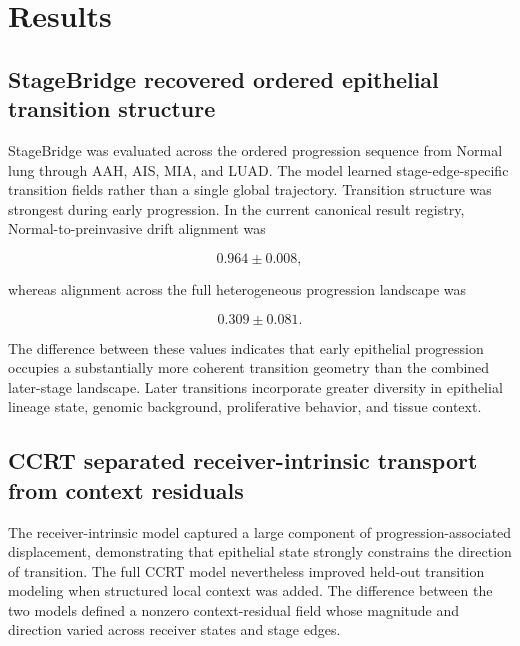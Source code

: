 \chapter{Results} \label{chap:results}

\section{StageBridge recovered ordered epithelial transition structure}

StageBridge was evaluated across the ordered progression sequence from Normal lung through AAH, AIS, MIA, and LUAD. The model learned stage-edge-specific transition fields rather than a single global trajectory. Transition structure was strongest during early progression. In the current canonical result registry, Normal-to-preinvasive drift alignment was

\begin{equation}
0.964\pm0.008,
\end{equation}

whereas alignment across the full heterogeneous progression landscape was

\begin{equation}
0.309\pm0.081.
\end{equation}

The difference between these values indicates that early epithelial progression occupies a substantially more coherent transition geometry than the combined later-stage landscape. Later transitions incorporate greater diversity in epithelial lineage state, genomic background, proliferative behavior, and tissue context.


\section{CCRT separated receiver-intrinsic transport from context residuals}

The receiver-intrinsic model captured a large component of progression-associated displacement, demonstrating that epithelial state strongly constrains the direction of transition. The full CCRT model nevertheless improved held-out transition modeling when structured local context was added. The difference between the two models defined a nonzero context-residual field whose magnitude and direction varied across receiver states and stage edges.

